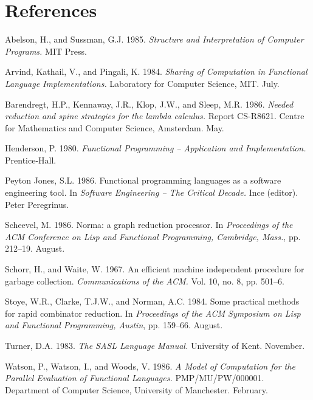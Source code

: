 \section*{References}

\begin{references}
    \item \item
    Abelson, H., and Sussman, G.J. 1985. \textit{Structure and Interpretation of Computer
        Programs.} MIT Press.

    \item
    Arvind, Kathail, V., and Pingali, K. 1984. \textit{Sharing of Computation in Functional
        Language Implementations.} Laboratory for Computer Science, MIT. July.

    \item
    Barendregt, H.P., Kennaway, J.R., Klop, J.W., and Sleep, M.R. 1986. \textit{Needed
        reduction and spine strategies for the lambda calculus.} Report CS-R8621. Centre
    for Mathematics and Computer Science, Amsterdam. May.

    \item
    Henderson, P. 1980. \textit{Functional Programming – Application and Implementation.}
    Prentice-Hall.

    \item
    Peyton Jones, S.L. 1986. Functional programming languages as a software engineering
    tool. In \textit{Software Engineering – The Critical Decade.} Ince (editor). Peter
    Peregrinus.

    \item
    Scheevel, M. 1986. Norma: a graph reduction processor. In \textit{Proceedings of the ACM
        Conference on Lisp and Functional Programming, Cambridge, Mass.}, pp. 212–19.
    August.

    \item
    Schorr, H., and Waite, W. 1967. An efficient machine independent procedure for
    garbage collection. \textit{Communications of the ACM.} Vol. 10, no. 8, pp. 501–6.

    \item
    Stoye, W.R., Clarke, T.J.W., and Norman, A.C. 1984. Some practical methods for
    rapid combinator reduction. In \textit{Proceedings of the ACM Symposium on Lisp and
        Functional Programming, Austin}, pp. 159–66. August.

    \item
    Turner, D.A. 1983. \textit{The SASL Language Manual.} University of Kent. November.

    \item
    Watson, P., Watson, I., and Woods, V. 1986. \textit{A Model of Computation for the Parallel
        Evaluation of Functional Languages.} PMP/MU/PW/000001. Department of
    Computer Science, University of Manchester. February.
\end{references}